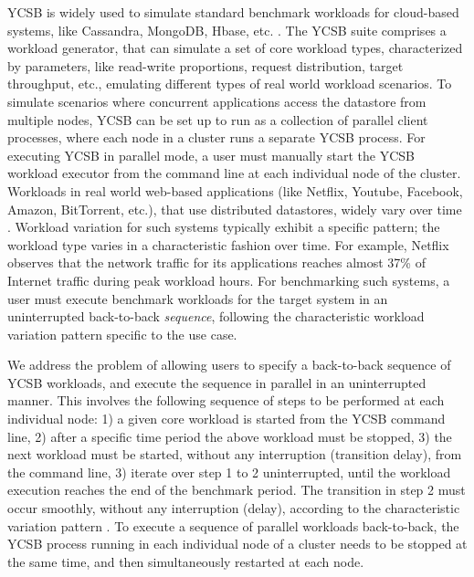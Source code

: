 \documentclass{vldb}
\begin{document}
YCSB \cite{Cooper:2010:BCS:1807128.1807152} is widely used to simulate standard benchmark workloads for cloud-based systems, like Cassandra, MongoDB, Hbase, etc. \cite{Lakshman:2010:CDS:1773912.1773922,Chodorow:2010:MDG:1941134}. %
           The YCSB suite comprises a workload generator, that can simulate a set of core workload types, characterized by parameters, like read-write proportions, request distribution, target throughput, etc., emulating different types of real world workload scenarios.
             To simulate scenarios where concurrent applications access the datastore from multiple nodes, YCSB can be set up to run as a collection of parallel client processes, where each node in a cluster runs a separate YCSB process. For executing YCSB in parallel mode, a user must manually start the YCSB workload executor from the command line at each individual node of the cluster. %
              Workloads in real world web-based applications (like Netflix, Youtube, Facebook, Amazon, BitTorrent, etc.), that use distributed datastores, widely vary over time \cite{NetflixWorkload-Variation}. Workload variation for such systems typically exhibit a specific pattern; the workload type varies in a characteristic fashion over time. For example, Netflix \cite{NetflixWorkload-Variation} observes that the network traffic for its applications reaches almost 37\% of Internet traffic during peak workload hours.
             For benchmarking such systems, a user must execute benchmark workloads for the
            target system in an uninterrupted back-to-back \emph{sequence}, following the characteristic workload variation pattern specific to the use case.
           \par We address the problem of allowing users to specify a back-to-back sequence of YCSB workloads, and execute the sequence in parallel in an uninterrupted manner. This involves the following sequence of steps to be performed at each individual node: 1) a given core workload is started from the YCSB command line, 2) after a specific time period the above workload must be stopped, 3) the next workload must be started, without any interruption (transition delay), from the command line, 3) iterate over step 1 to 2 uninterrupted, until the workload execution reaches the end of the benchmark period. The transition in step 2 must occur smoothly, without any interruption (delay), according to the characteristic variation pattern \cite{NetflixWorkload-Variation}. To execute a sequence of parallel workloads back-to-back, the YCSB process running in each individual node of a cluster needs to be stopped at the same time, and then simultaneously restarted at each node.
\end{document}
